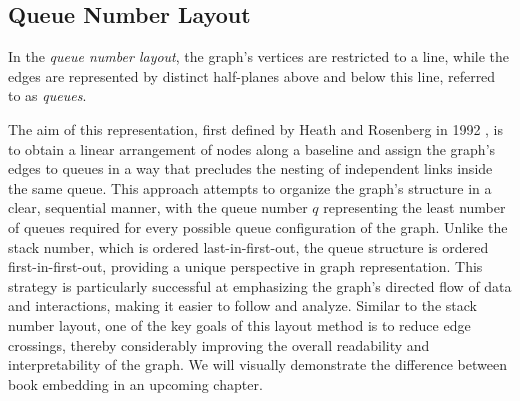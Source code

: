 \documentclass[bachelor, english]{algothesis}
\begin{document}
\newpage
\subsection{Queue Number Layout}
\begin{definition}
    In the \emph{queue number layout}, the graph's vertices are restricted to a line, while the edges are represented by distinct half-planes above and below this line, referred to as \emph{queues}.
\end{definition}
\noindent
The aim of this representation, first defined by Heath and Rosenberg in 1992 \cite{queue_layout}, is to obtain a linear arrangement of nodes along a baseline and assign the graph's edges to queues in a way that precludes the nesting of independent links inside the same queue. This approach attempts to organize the graph's structure in a clear, sequential manner, with the queue number $q$ representing the least number of queues required for every possible queue configuration of the graph. Unlike the stack number, which is ordered last-in-first-out, the queue structure is ordered first-in-first-out, providing a unique perspective in graph representation. This strategy is particularly successful at emphasizing the graph's directed flow of data and interactions, making it easier to follow and analyze. Similar to the stack number layout, one of the key goals of this layout method is to reduce edge crossings, thereby considerably improving the overall readability and interpretability of the graph. We will visually demonstrate the difference between book embedding in an upcoming chapter.
\end{document}
